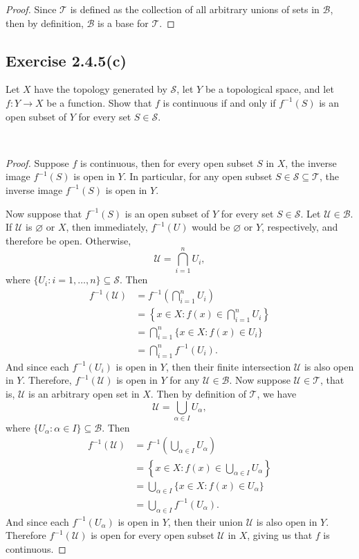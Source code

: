 \documentclass[12pt]{article}
\newenvironment{problem}
    {\begin{lrbox}{\mybox}\begin{minipage}{\textwidth-10pt}}
    {\end{minipage}\end{lrbox}\framebox[6.5in]{\usebox{\mybox}}\\}
\let\emptyset\varnothing
\newcommand{\T}{\mathscr{T}}
\renewcommand{\S}{\mathscr{S}}
\newcommand{\B}{\mathscr{B}}
\begin{document}
\begin{proof}
    Since $\T$ is defined as the collection of all arbitrary unions of sets in $\B$, then by definition, $\B$ is a base for $\T$.
    
\end{proof}

\subsection*{Exercise 2.4.5(c)}
\begin{problem}
    Let $X$ have the topology generated by $\S$, let $Y$ be a topological space, and let $f:Y\to X$ be a function. Show that $f$ is continuous if and only if $f^{-1}(S)$ is an open subset of $Y$ for every set $S\in\S$. 
\end{problem}

\begin{proof}
    Suppose $f$ is continuous, then for every open subset $S$ in $X$, the inverse image $f^{-1}(S)$ is open in $Y$. In particular, for any open subset $S\in\S\subseteq\T$, the inverse image $f^{-1}(S)$ is open in $Y$.
    
    Now suppose that $f^{-1}(S)$ is an open subset of $Y$ for every set $S\in\S$. Let $\mathcal{U}\in\B$. If $\mathcal{U}$ is $\emptyset$ or $X$, then immediately, $f^{-1}(U)$ would be $\emptyset$ or $Y$, respectively, and therefore be open. Otherwise,
    \[\mathcal{U} = \bigcap_{i=1}^nU_i,\]
    where $\{U_i : i=1,\dots,n\} \subseteq \S$. Then
    \begin{align*}
        f^{-1}(\mathcal{U})
            &= f^{-1}\left(\bigcap_{i=1}^nU_i\right) \\
            &= \left\{x\in X : f(x) \in \bigcap_{i=1}^nU_i \right\} \\
            &= \bigcap_{i=1}^n\{x\in X : f(x) \in U_i \} \\
            &= \bigcap_{i=1}^nf^{-1}(U_i).
    \end{align*}
    And since each $f^{-1}(U_i)$ is open in $Y$, then their finite intersection $\mathcal{U}$ is also open in $Y$. Therefore, $f^{-1}(\mathcal{U})$ is open in $Y$ for any $\mathcal{U}\in\B$. Now suppose $\mathcal{U}\in\T$, that is, $\mathcal{U}$ is an arbitrary open set in $X$. Then by definition of $\T$, we have
    \[\mathcal{U} = \bigcup_{\alpha\in I}U_\alpha,\]
    where $\{U_\alpha : \alpha\in I\} \subseteq \B$. Then
    \begin{align*}
        f^{-1}(\mathcal{U})
            &= f^{-1}\left(\bigcup_{\alpha\in I}U_\alpha\right) \\
            &= \left\{x\in X : f(x) \in \bigcup_{\alpha\in I}U_\alpha \right\} \\
            &= \bigcup_{\alpha\in I}\{x\in X : f(x) \in U_\alpha \} \\
            &= \bigcup_{\alpha\in I}f^{-1}(U_\alpha).
    \end{align*}
    And since each $f^{-1}(U_\alpha)$ is open in $Y$, then their union $\mathcal{U}$ is also open in $Y$. Therefore $f^{-1}(\mathcal{U})$ is open for every open subset $\mathcal{U}$ in $X$, giving us that $f$ is continuous.
    
\end{proof}
\end{document}
